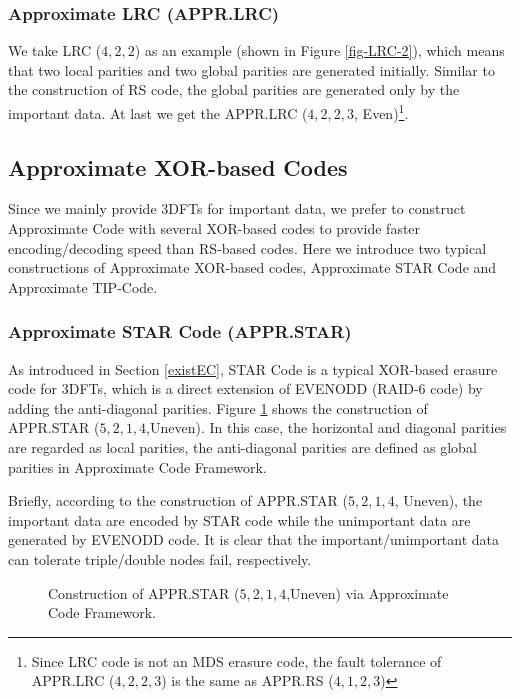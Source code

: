\documentclass[sigconf]{acmart}
\begin{document}
\subsubsection{Approximate LRC (APPR.LRC)}

We take LRC ($4, 2, 2$) \cite{LRC} as an example (shown in Figure \ref{fig-LRC-2}), which means
that two local parities and two global parities are generated initially. Similar to the construction of RS code, the global parities are generated only by the important data. At last we get the APPR.LRC ($4, 2, 2, 3$, Even)\footnote{Since LRC code is not an MDS erasure code, the fault tolerance of APPR.LRC ($4, 2, 2, 3$) is the same as APPR.RS ($4,1,2,3$)}.

\subsection{Approximate XOR-based Codes}\label{APPRXOR}
Since we mainly provide 3DFTs for important data, we prefer to construct Approximate Code with several XOR-based codes to provide faster encoding/decoding speed than RS-based codes. Here we introduce two typical constructions of Approximate XOR-based codes, Approximate STAR Code and Approximate TIP-Code.

\subsubsection{Approximate STAR Code (APPR.STAR)}

As introduced in Section \ref{existEC}, STAR Code \cite{STAR} is a typical XOR-based erasure code for 3DFTs, which is a direct extension of EVENODD\cite{EVENODD} (RAID-6 code) by adding the anti-diagonal parities. Figure \ref{fig-ap-STAR} shows the construction of APPR.STAR ($5,2,1,4$,Uneven). In this case, the horizontal and diagonal parities are regarded as local parities,  the anti-diagonal parities are defined as global parities in Approximate Code Framework.

Briefly, according to the construction of APPR.STAR ($5,2,1,4$, Uneven), the important data are encoded by STAR code while the unimportant data are generated by EVENODD code. It is clear that the important/unimportant data can tolerate triple/double nodes fail, respectively.

\begin{figure}[ht]
\centering
{}


\caption{Construction of APPR.STAR  ($5,2,1,4$,Uneven) via Approximate Code Framework.}\label{fig-ap-STAR}
\end{figure}
\end{document}
